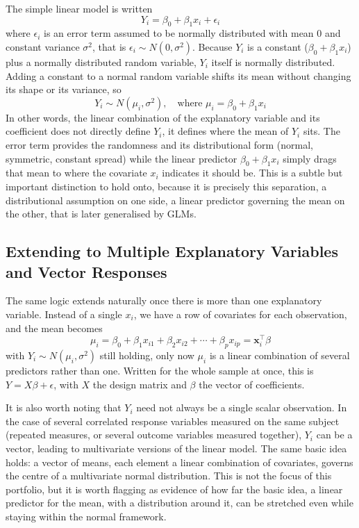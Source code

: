 \documentclass[12pt,a4paper]{report}
\begin{document}
The simple linear model is written
\[
Y_i = \beta_0 + \beta_1 x_i + \epsilon_i
\]
where $\epsilon_i$ is an error term assumed to be normally distributed with mean 0 and constant variance $\sigma^2$, that is $\epsilon_i \sim N(0,\sigma^2)$. Because $Y_i$ is a constant ($\beta_0 + \beta_1 x_i$) plus a normally distributed random variable, $Y_i$ itself is normally distributed. Adding a constant to a normal random variable shifts its mean without changing its shape or its variance, so
\[
Y_i \sim N(\mu_i, \sigma^2), \quad \text{where } \mu_i = \beta_0 + \beta_1 x_i
\]
In other words, the linear combination of the explanatory variable and its coefficient does not directly define $Y_i$, it defines where the mean of $Y_i$ sits. The error term provides the randomness and its distributional form (normal, symmetric, constant spread) while the linear predictor $\beta_0 + \beta_1 x_i$ simply drags that mean to where the covariate $x_i$ indicates it should be. This is a subtle but important distinction to hold onto, because it is precisely this separation, a distributional assumption on one side, a linear predictor governing the mean on the other, that is later generalised by GLMs.

\subsection*{Extending to Multiple Explanatory Variables and Vector Responses}

The same logic extends naturally once there is more than one explanatory variable. Instead of a single $x_i$, we have a row of covariates for each observation, and the mean becomes
\[
\mu_i = \beta_0 + \beta_1 x_{i1} + \beta_2 x_{i2} + \cdots + \beta_p x_{ip} = \mathbf{x}_i^\top \beta
\]
with $Y_i \sim N(\mu_i, \sigma^2)$ still holding, only now $\mu_i$ is a linear combination of several predictors rather than one. Written for the whole sample at once, this is $Y = X\beta + \epsilon$, with $X$ the design matrix and $\beta$ the vector of coefficients.

It is also worth noting that $Y_i$ need not always be a single scalar observation. In the case of several correlated response variables measured on the same subject (repeated measures, or several outcome variables measured together), $Y_i$ can be a vector, leading to multivariate versions of the linear model. The same basic idea holds: a vector of means, each element a linear combination of covariates, governs the centre of a multivariate normal distribution. This is not the focus of this portfolio, but it is worth flagging as evidence of how far the basic idea, a linear predictor for the mean, with a distribution around it, can be stretched even while staying within the normal framework.
\end{document}
